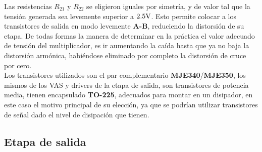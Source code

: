 Las resistencias $R_{21}$ y $R_{22}$ se eligieron iguales por simetría, y de valor tal que la tensión generada sea levemente superior a $2.5 \si[per-mode=symbol]{\volt}$. Esto permite colocar a los transistores de salida en modo levemente \textbf{A-B}, reduciendo la distorsión de su etapa.
De todas formas la manera de determinar en la práctica el valor adecuado de tensión del multiplicador, es ir aumentando la caída hasta que ya no baja la distorsión armónica, habiéndose eliminado por completo la distorsión de cruce por cero.\\
Los transistores utilizados son el par complementario \textbf{MJE340}/\textbf{MJE350}, los mismos de los VAS y drivers de la etapa de salida, son transistores de potencia media,  tienen encapsulado \textbf{TO-225}, adecuados para montar en un disipador, en este caso el motivo principal de su elección, ya que se podrían utilizar transistores de señal dado el nivel de disipación que tienen.





\clearpage



\subsection{Etapa de salida}

